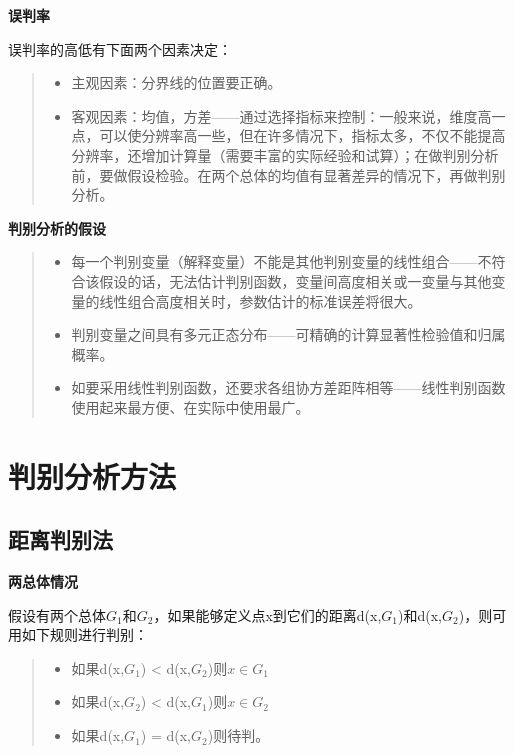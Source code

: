 \documentclass[]{ctexbook}
\providecommand{\tightlist}{%
  \setlength{\itemsep}{0pt}\setlength{\parskip}{0pt}}
\begin{document}
\textbf{误判率}

误判率的高低有下面两个因素决定：

\begin{quote}
\begin{itemize}
\tightlist
\item
  主观因素：分界线的位置要正确。
\item
  客观因素：均值，方差------通过选择指标来控制：一般来说，维度高一点，可以使分辨率高一些，但在许多情况下，指标太多，不仅不能提高分辨率，还增加计算量（需要丰富的实际经验和试算）；在做判别分析前，要做假设检验。在两个总体的均值有显著差异的情况下，再做判别分析。
\end{itemize}
\end{quote}

\textbf{判别分析的假设}

\begin{quote}
\begin{itemize}
\tightlist
\item
  每一个判别变量（解释变量）不能是其他判别变量的线性组合------不符合该假设的话，无法估计判别函数，变量间高度相关或一变量与其他变量的线性组合高度相关时，参数估计的标准误差将很大。
\item
  判别变量之间具有多元正态分布------可精确的计算显著性检验值和归属概率。
\item
  如要采用线性判别函数，还要求各组协方差距阵相等------线性判别函数使用起来最方便、在实际中使用最广。
\end{itemize}
\end{quote}

\hypertarget{ux5224ux522bux5206ux6790ux65b9ux6cd5}{%
\section{判别分析方法}\label{ux5224ux522bux5206ux6790ux65b9ux6cd5}}

\hypertarget{ux8dddux79bbux5224ux522bux6cd5}{%
\subsection{距离判别法}\label{ux8dddux79bbux5224ux522bux6cd5}}

\textbf{两总体情况}

假设有两个总体\(G_1\)和\(G_2\)，如果能够定义点x到它们的距离d(x,\(G_1\))和d(x,\(G_2\))，则可用如下规则进行判别：

\begin{quote}
\begin{itemize}
\tightlist
\item
  如果d(x,\(G_1\)) \textless{} d(x,\(G_2\))则\(x\in G_1\)
\item
  如果d(x,\(G_2\)) \textless{} d(x,\(G_1\))则\(x\in G_2\)
\item
  如果d(x,\(G_1\)) = d(x,\(G_2\))则待判。
\end{itemize}
\end{quote}
\end{document}
